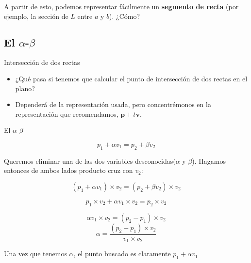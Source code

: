 \documentclass[compress]{beamer}
\newcommand{\bigpause}{\bigskip \pause}
\begin{document}
\begin{frame}

A partir de esto, podemos representar f\'acilmente un \textbf{segmento de recta} (por ejemplo, la secci\'on de $L$ entre $a$ y $b$). ¿C\'omo?

\bigpause
{}
\end{frame}

\subsection{El $\alpha$-$\beta$}

\begin{frame}{Intersección de dos rectas}

\begin{itemize}
    \item ¿Qué pasa si tenemos que calcular el punto de intersección de dos rectas en el plano?
    \item Dependerá de la representación usada, pero concentrémonos en la representación que recomendamos, $\mathbf{p} + t\mathbf{v}$.
\end{itemize}    
\pause

\end{frame}

\begin{frame}{El $\alpha$-$\beta$}

    $$p_1 + \alpha v_1 = p_2 + \beta v_2$$
    
    Queremos eliminar una de las dos variables desconocidas($\alpha$ y $\beta$). Hagamos entonces de ambos lados producto cruz con $v_2$:
    
    $$(p_1 + \alpha v_1) \times v_2 = (p_2 + \beta v_2) \times v_2$$
    
    $$p_1 \times v_2 + \alpha v_1 \times v_2 = p_2  \times v_2$$
    
    $$\alpha v_1 \times v_2 = (p_2 - p_1)  \times v_2$$
    $$\alpha = \frac{(p_2 - p_1)  \times v_2}{v_1 \times v_2}$$

Una vez que tenemos $\alpha$, el punto buscado es claramente $p_1 + \alpha v_1$

\end{frame}    
\end{document}
